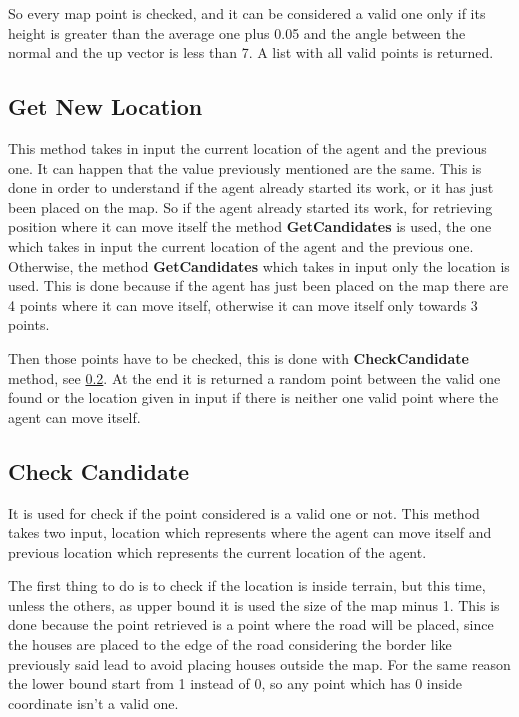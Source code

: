 \documentclass[12pt]{article}
\begin{document}
    So every map point is checked, and it can be considered a valid one only if its height is greater than the average one plus 0.05 and the angle between the normal 
    and the up vector is less than 7. A list with all valid points is returned.

    \subsection{Get New Location} \label{section:NewLocation}
    This method takes in input the current location of the agent and the previous one. It can happen that the value previously mentioned are the same. This is done in order
    to understand if the agent already started its work, or it has just been placed on the map. So if the agent already started its work, for retrieving position where it
    can move itself the method \textbf{GetCandidates} is used, the one which takes in input the current location of the agent and the previous one. Otherwise, the method
    \textbf{GetCandidates} which takes in input only the location is used. This is done because if the agent has just been placed on the map there are 4 points 
    where it can move itself, otherwise it can move itself only towards 3 points.
    
    Then those points have to be checked, this is done with \textbf{CheckCandidate} method, see \ref{section:CheckCandidate}. At the end it is returned a random point
    between the valid one found or the location given in input if there is neither one valid point where the agent can move itself.
     
    \subsection{Check Candidate} \label{section:CheckCandidate}
    It is used for check if the point considered is a valid one or not. This method takes two input, location which represents where the agent can move itself and 
    previous location which represents the current location of the agent.

    The first thing to do is to check if the location is inside terrain, but this time, unless the others, as upper bound it is used the size of the map minus 1. This is done
    because the point retrieved is a point where the road will be placed, since the houses are placed to the edge of the road considering the border like previously said
    lead to avoid placing houses outside the map. For the same reason the lower bound start from 1 instead of 0, so any point which has 0 inside coordinate isn't a valid one.
\end{document}
